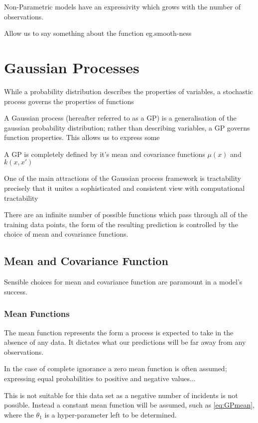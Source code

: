 \documentclass[a4paper,11pt]{report}
\begin{document}
Non-Parametric models have an expressivity which grows with the number of observations. 


Allow us to say something about the function eg.smooth-ness


\chapter{Gaussian Processes}

While a probability distribution describes the properties of variables, a stochastic process governs the properties of functions

A Gaussian process (hereafter referred to as a GP) is a generalisation of the gaussian probability distribution; rather than describing variables, a GP governs function properties. This allows us to express some 

A GP is completely defined by it's mean and covariance functions \(\mu (x)\) and \( k(x,x') \)

One of the main attractions of the Gaussian process framework is
tractability precisely that it unites a sophisticated and consistent view with computational
tractability

There are an infinite number of possible functions which pass through all of the training data points, the form of the resulting prediction is controlled by the choice of mean and covariance functions.

\section{Mean and Covariance Function}

Sensible choices for mean and covariance function are paramount in a model's success.  

\subsection{Mean Functions}

The mean function represents the form a process is expected to take in the absence of any data. It dictates what our predictions will be far away from any observations.

In the case of complete ignorance a zero mean function is often assumed; expressing equal probabilities to positive and negative values...

This is not suitable for this data set as a negative number of incidents is not possible. Instead a constant mean function will be assumed, such as \ref{eq:GPmean}, where the \(\theta_1\) is a hyper-parameter left to be determined.
\end{document}
